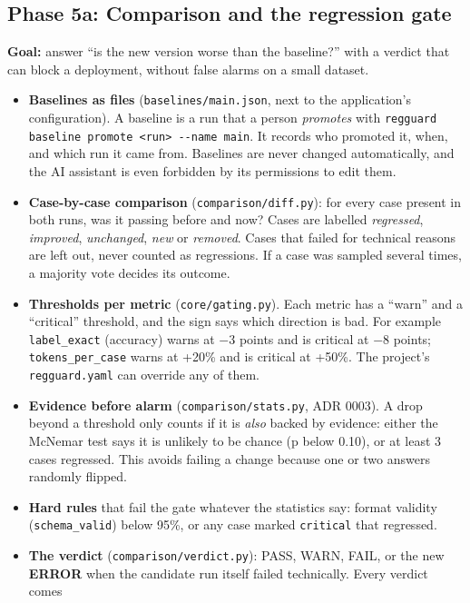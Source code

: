 \documentclass[11pt,a4paper]{article}
\newcommand{\code}[1]{\nolinkurl{#1}}
\newcommand{\minus}{$-$}
\begin{document}
\subsection{Phase 5a: Comparison and the regression gate}
\textbf{Goal:} answer ``is the new version worse than the baseline?'' with a verdict that can
block a deployment, without false alarms on a small dataset.
\begin{itemize}
  \item \textbf{Baselines as files} (\code{baselines/main.json}, next to the application's
        configuration). A baseline is a run that a person \emph{promotes} with
        \texttt{regguard baseline promote <run> -{}-name main}. It records who promoted it,
        when, and which run it came from. Baselines are never changed automatically, and the
        AI assistant is even forbidden by its permissions to edit them.
  \item \textbf{Case-by-case comparison} (\code{comparison/diff.py}): for every case present in
        both runs, was it passing before and now? Cases are labelled \emph{regressed},
        \emph{improved}, \emph{unchanged}, \emph{new} or \emph{removed}. Cases that failed for
        technical reasons are left out, never counted as regressions. If a case was sampled
        several times, a majority vote decides its outcome.
  \item \textbf{Thresholds per metric} (\code{core/gating.py}). Each metric has a ``warn'' and a
        ``critical'' threshold, and the sign says which direction is bad. For example
        \code{label_exact} (accuracy) warns at \minus3 points and is critical at \minus8 points;
        \code{tokens_per_case} warns at +20\% and is critical at +50\%. The project's
        \code{regguard.yaml} can override any of them.
  \item \textbf{Evidence before alarm} (\code{comparison/stats.py}, ADR 0003). A drop beyond a
        threshold only counts if it is \emph{also} backed by evidence: either the McNemar test
        says it is unlikely to be chance (p below 0.10), or at least 3 cases regressed. This
        avoids failing a change because one or two answers randomly flipped.
  \item \textbf{Hard rules} that fail the gate whatever the statistics say: format validity
        (\code{schema_valid}) below 95\%, or any case marked \code{critical} that regressed.
  \item \textbf{The verdict} (\code{comparison/verdict.py}): PASS, WARN, FAIL, or the new
        \textbf{ERROR} when the candidate run itself failed technically. Every verdict comes

\end{itemize}
\end{document}
